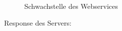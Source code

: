 \documentclass[12pt,a4paper,titlepage,oneside]{scrartcl}
\begin{document}
\begin{figure}[h!]
  \centering
  \caption{Schwachstelle des Webservices}
  \label{fig:logo5}
\end{figure}

Response des Servers:
\end{document}
